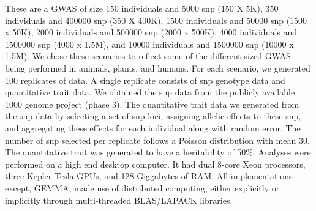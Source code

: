 \documentclass{nature}
\begin{document}
These are a GWAS of size 150 individuals and 5000 snp (150 X 5K), 350 individuals and 400000 snp (350 X 400K),  1500 individuals and 
50000 snp (1500 x 50K), 2000 individuals and 500000 snp (2000 x 500K), 4000 individuals and 
1500000 snp (4000 x 1.5M), and 10000 individuals and 1500000 snp (10000 x 1.5M).  
We chose these scenarios to reflect some of the different sized GWAS being performed in animals, plants, and humans. 
For each scenario, we generated 100 replicates of data. A single replicate consists of snp genotype data and quantitative trait data. 
We obtained the snp data from the publicly available 1000 genome project (phase 3). The quantitative trait data we generated from the 
snp data by selecting a set of snp loci, assigning allelic effects to these snp, and aggregating these effects for each individual along with 
random error. The number of snp selected per replicate follows a Poisson distribution with mean 30.
 The quantitative trait was generated to have a heritability of 50\%.
Analyses were performed on a high end desktop computer. It had dual 8-core Xeon processors, three Kepler Tesla GPUs, and 128 Giggabytes of RAM. All implementations except, GEMMA, made use of distributed computing, either explicitly or implicitly through multi-threaded BLAS/LAPACK libraries. 
\end{document}
